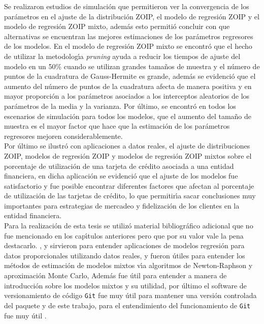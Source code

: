 Se realizaron estudios de simulaci\'{o}n que permitieron ver la convergencia de los par\'{a}metros en el ajuste de la distribuci\'{o}n ZOIP, el modelo de regresi\'{o}n ZOIP y el modelo de regresi\'{o}n ZOIP mixto, adem\'{a}s esto permiti\'{o} concluir con que alternativas se encuentran las mejores estimaciones de los par\'{a}metros regresores de los modelos. En el modelo de regresi\'{o}n ZOIP mixto se encontr\'{o} que el hecho de utilizar la metodolog\'{\i}a \textit{pruning} ayuda a reducir los tiempos de ajuste del modelo en un 50\% cuando se utilizan grandes tama\~{n}os de muestra y el n\'{u}mero de puntos de la cuadratura de Gauss-Hermite es grande, adem\'{a}s se evidenci\'{o} que el aumento del n\'{u}mero de puntos de la cuadratura afecta de manera positiva y en mayor proporci\'{o}n a los par\'{a}metros asociados a los interceptos aleatorios de los par\'{a}metros de la media y la varianza. Por \'{u}ltimo, se encontr\'{o} en todos los escenarios de simulaci\'{o}n para todos los modelos, que el aumento del tama\~{n}o de muestra es el mayor factor que hace que la estimaci\'{o}n de los par\'{a}metros regresores mejoren considerablemente.\\

Por \'{u}ltimo se ilustr\'{o} con aplicaciones a datos reales, el ajuste de distribuciones ZOIP, modelos de regresi\'{o}n ZOIP y modelos de regresi\'{o}n ZOIP mixtos sobre el porcentaje de utilizaci\'{o}n de una tarjeta de cr\'{e}dito asociada a una entidad financiera, en dicha aplicaci\'{o}n se evidenci\'{o} que el ajuste de los modelos fue satisfactorio y  fue posible encontrar diferentes factores que afectan al porcentaje de utilizaci\'{o}n de las tarjetas de cr\'{e}dito, lo que permitir\'{\i}a sacar conclusiones muy importantes para estrategias de mercadeo y fidelizaci\'{o}n de los clientes en la entidad financiera.\\

Para la realizaci\'{o}n de esta tesis se utiliz\'{o} material bibliogr\'{a}fico adicional que no fue mencionado en los cap\'{\i}tulos anteriores pero que por su valor vale la pena destacarlo. \cite{Cook1}, \cite{Houston1} y \cite{kieschnick1} sirvieron para entender aplicaciones de modelos regresi\'{o}n para datos proporcionales utilizando datos reales, \cite{Evans1} y \cite{Lindstrom1} fueron \'{u}tiles para entender los m\'{e}todos de estimaci\'{o}n de modelos mixtos v\'{\i}a algoritmos de Newton-Raphson y aproximaci\'{o}n Monte Carlo, Adem\'{a}s \cite{Seoane1} fue \'{u}til para entender a manera de introducci\'{o}n sobre los modelos mixtos y su utilidad, por \'{u}ltimo el software de versionamiento de c\'{o}digo \verb|Git| fue muy \'{u}til para mantener una versi\'{o}n controlada del paquete  y de este trabajo, para el entendimiento del funcionamiento de \verb|Git| fue muy \'{u}til \cite{Git1}.


